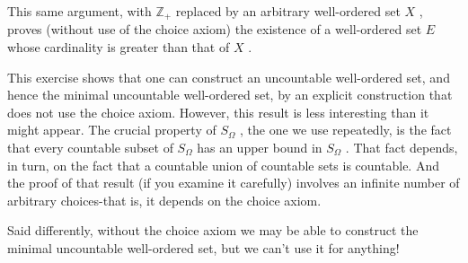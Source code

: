 This same argument, with \({\mathbb{Z}}_{ + }\) replaced by an arbitrary well-ordered set \(X\) , proves (without use of the choice axiom) the existence of a well-ordered set \(E\) whose cardinality is greater than that of \(X\) .

This exercise shows that one can construct an uncountable well-ordered set, and hence the minimal uncountable well-ordered set, by an explicit construction that does not use the choice axiom. However, this result is less interesting than it might appear. The crucial property of \({S}_{\Omega }\) , the one we use repeatedly, is the fact that every countable subset of \({S}_{\Omega }\) has an upper bound in \({S}_{\Omega }\) . That fact depends, in turn, on the fact that a countable union of countable sets is countable. And the proof of that result (if you examine it carefully) involves an infinite number of arbitrary choices-that is, it depends on the choice axiom.

Said differently, without the choice axiom we may be able to construct the minimal uncountable well-ordered set, but we can't use it for anything!
